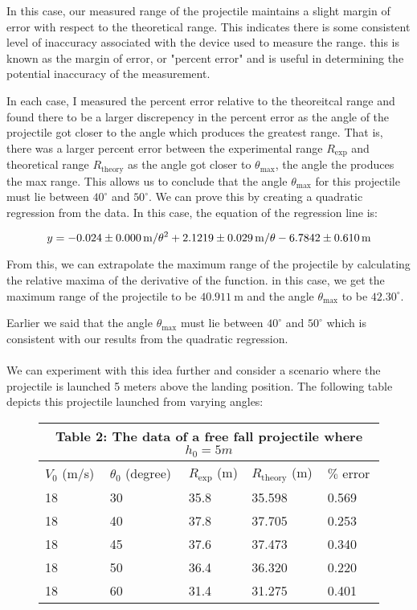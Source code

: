 \documentclass[12pt]{article}
\begin{document}
In this case, our measured range of the projectile maintains a slight margin of error with respect to the theoretical range. This indicates there is some consistent level of inaccuracy associated with the device used to measure the range. this is known as the margin of error, or "percent error" and is useful in determining the potential inaccuracy of the measurement.

In each case, I measured the percent error relative to the theoreitcal range and found there to be a larger discrepency in the percent error as the angle of the projectile got closer to the angle which produces the greatest range. That is, there was a larger percent error between the experimental range $R_\text{exp}$ and theoretical range $R_\text{theory}$ as the angle got closer to $\theta_\text{max}$, the angle the produces the max range. This allows us to conclude that the angle $\theta_\text{max}$ for this projectile must lie between $40^\circ$ and $50^\circ$. We can prove this by creating a quadratic regression from the data. In this case, the equation of the regression line is:

\[ y=-0.024 \pm \SI{0.000}{\metre\per\theta\squared}+2.1219 \pm \SI{0.029}{\metre\per\theta}-6.7842\pm \SI{0.610}{\metre}\]

From this, we can extrapolate the maximum range of the projectile by calculating the relative maxima of the derivative of the function. in this case, we get the maximum range of the projectile to be $\SI{40.911}{\metre}$ and the angle $\theta_\text{max}$ to be $42.30^\circ$.

Earlier we said that the angle $\theta_\text{max}$ must lie between $40^\circ$ and $50^\circ$ which is consistent with our results from the quadratic regression.

\paragraph{}

We can experiment with this idea further and consider a scenario where the projectile is launched 5 meters above the landing position. The following table depicts this projectile launched from varying angles:

\begin{figure}[H]
    \centering
    \begin{tabular}{ p{2cm}p{2cm}p{2cm}p{2cm}p{2cm} }
        \hline
        \multicolumn{5}{c}{Table 2: The data of a free fall projectile where $h_0=5m$} \\
        \hline
        $V_0$ (m/s) & $\theta_0$ (degree) & $R_\text{exp}$ (m) & $R_\text{theory}$ (m) & $\%$ error \\
        \hline
        18 & 30 & 35.8 & 35.598 & 0.569 \\
        18 & 40 & 37.8 & 37.705 & 0.253 \\
        18 & 45 & 37.6 & 37.473 & 0.340 \\
        18 & 50 & 36.4 & 36.320 & 0.220 \\
        18 & 60 & 31.4 & 31.275 & 0.401 \\
        \hline
    \end{tabular}
\end{figure}
\end{document}
